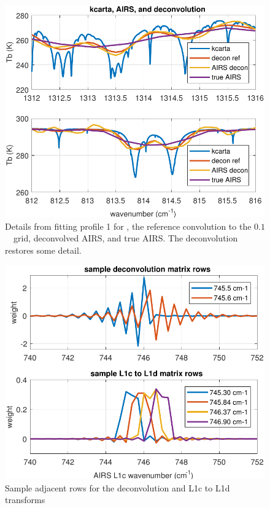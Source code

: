 \documentclass[journal]{IEEEtran}
\begin{document}
\begin{figure} %
  \centering
  \includegraphics[width=\linewidth]{figures/airs_decon_zoom.pdf}
  \caption{Details from fitting profile 1 for {\kcarta}, the
    reference convolution to the $0.1$~\wn\ grid, deconvolved
    AIRS, and true AIRS.  The deconvolution restores some
    detail.}
  \label{dzoom}
\end{figure}

\begin{figure} %
  \centering
  \includegraphics[width=\linewidth]{figures/airs_decon_basis.pdf}
  \caption{Sample adjacent rows for the deconvolution and L1c to L1d
    transforms}
  \label{dbasis}
\end{figure}
\end{document}
